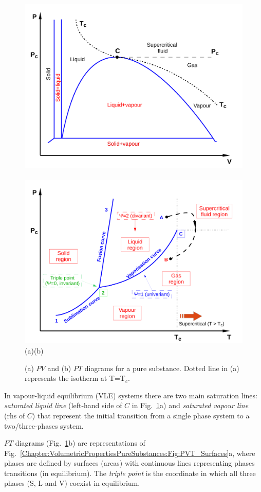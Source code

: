           \begin{figure}[h]
              \vbox{
                    \hbox{\includegraphics[width=.5\columnwidth,clip]{./Figs/PV_Diagram1}
                          \includegraphics[width=.5\columnwidth,clip]{./Figs/PT_Diagram}}
                    \vspace{-.1cm}
                    \hbox{\hspace{4cm}(a)\hspace{8cm}(b)}}
              \caption{ (a) $PV$ and (b) $PT$ diagrams for a pure substance. Dotted line in (a) represents the isotherm at T=T$_{c}$.}\label{Chapter:VolumetricPropertiesPureSubstances:Fig:PV-PT_Diagrams}
           \end{figure}


           In vapour-liquid equilibrium (VLE) systems there are two main saturation lines: {\it saturated liquid line} (left-hand side of $C$ in Fig.~\ref{Chapter:VolumetricPropertiesPureSubstances:Fig:PV-PT_Diagrams}a)  and {\it saturated vapour line} (rhs of $C$) that represent the initial transition from a single phase system to a two/three-phases system. 
%

$PT$ diagrams (Fig.~\ref{Chapter:VolumetricPropertiesPureSubstances:Fig:PV-PT_Diagrams}b) are representations of Fig.~\ref{Chapter:VolumetricPropertiesPureSubstances:Fig:PVT_Surfaces}a, where phases are defined by surfaces (\ie areas) with continuous lines representing phases transitions (\ie in equilibrium). The {\it triple point} is the coordinate in which all three phases (S, L and V) coexist in equilibrium.

